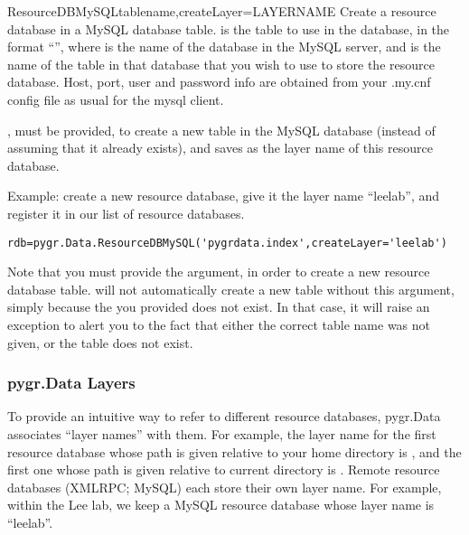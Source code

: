 \documentclass{howto}
\begin{document}
\begin{funcdesc}{ResourceDBMySQL}{tablename,createLayer=LAYERNAME}
  Create a resource database in a MySQL database table.
   is the table to use in the database, in the format
  ``'', where  is the name of the
  database in the MySQL server, and  is the name of
  the table in that database that you wish to use to store the
  resource database.  Host, port, user and password info are obtained
  from your .my.cnf config file as usual for the mysql client.

  , must be provided, to create a new table
  in the MySQL database (instead of assuming that it already exists),
  and saves  as the layer name of this resource database.

  Example: create a new resource database, give it the layer name ``leelab'',
  and register it in our list of resource databases.
\begin{verbatim}
rdb=pygr.Data.ResourceDBMySQL('pygrdata.index',createLayer='leelab')
\end{verbatim}
  Note that you must provide the  argument, in order to 
  create a new resource database table.   will not
  automatically create a new table without this argument, simply because the
   you provided does not exist.  In that case, it will
  raise an exception to alert you to the fact that either the correct table name
  was not given, or the table does not exist.
\end{funcdesc}




\subsubsection{pygr.Data Layers}
To provide an intuitive way to refer to different resource databases,
pygr.Data associates ``layer names'' with them.  For example, the layer
name for the first resource database whose path is given relative to 
your home directory is , and the first one whose path is given
relative to current directory is .  Remote resource databases
(XMLRPC; MySQL) each store their own layer name.  For example, within the
Lee lab, we keep a MySQL resource database whose layer name is ``leelab''.
\end{document}
